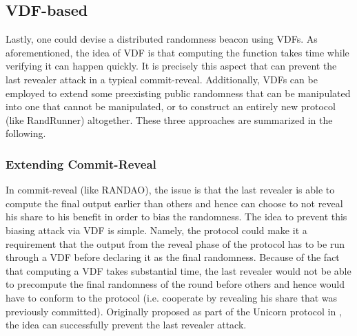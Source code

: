 \documentclass[letterpaper,twocolumn,10pt]{article}
\theoremstyle{definition}
\theoremstyle{remark}
\begin{document}

\subsection{VDF-based}
Lastly, one could devise a distributed randomness beacon using VDFs. As aforementioned, the idea of VDF is that computing the function takes time while verifying it can happen quickly. It is precisely this aspect that can prevent the last revealer attack in a typical commit-reveal. Additionally, VDFs can be employed to extend some preexisting public randomness that can be manipulated into one that cannot be manipulated, or to construct an entirely new protocol (like RandRunner) altogether. These three approaches are summarized in the following.

\subsubsection{Extending Commit-Reveal}
In commit-reveal (like RANDAO), the issue is that the last revealer is able to compute the final output earlier than others and hence can choose to not reveal his share to his benefit in order to bias the randomness. The idea to prevent this biasing attack via VDF is simple. Namely, the protocol could make it a requirement that the output from the reveal phase of the protocol has to be run through a VDF before declaring it as the final randomness. Because of the fact that computing a VDF takes substantial time, the last revealer would not be able to precompute the final randomness of the round before others and hence would have to conform to the protocol (i.e. cooperate by revealing his share that was previously committed). Originally proposed as part of the Unicorn protocol in \cite{lenstra2015random}, the idea can successfully prevent the last revealer attack.

\end{document}

